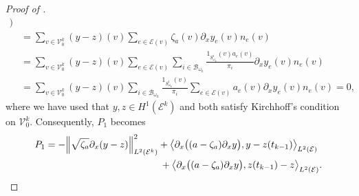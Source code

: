 \documentclass[a4paper, 10pt, english]{article}
\begin{document}
\begin{proof}[Proof of  ]
\begin{align*}
   \bigg)\\
   &= \sum_{v \in \mathcal{V}^k_0}
   (y - z)(v)
     \sum_{e \in \mathcal{E}(v)} \zeta_a(v)\partial_x y_e(v)n_e(v)
   \\
   &=\sum_{v \in \mathcal{V}^k_0}
   (y - z)(v)
     \sum_{e \in \mathcal{E}(v)} \sum_{i\in \mathcal{B}_{\omega_k}}\frac{1_{S_{\omega_k}^i}(v)a_e(v)}{\pi_i}\partial_x y_e(v)n_e(v)
     \\
   &=\sum_{v \in \mathcal{V}^k_0}
   (y - z)(v)
      \sum_{i\in \mathcal{B}_{\omega_k}}\frac{1_{S_{\omega_k}^i}(v)}{\pi_i}\sum_{e \in \mathcal{E}(v)}a_e(v)\partial_x y_e(v)n_e(v) = 0,
\end{align*}
where we have used that $y,z \in H^1(\mathcal{E}^k)$ and both satisfy Kirchhoff's condition on $\mathcal{V}_{0}^k$. 
Consequently, $P_1$ becomes
\begin{align}\label{eq:last_relation_p1}
P_1
&=
-\Bigl\|\sqrt{\zeta_a}\partial_x (y - z)\Bigr\|_{L^2(\mathcal{E}^k)}^2
+
\bigl\langle
  \partial_x\bigl((a - \zeta_a)\partial_x y\bigr),
  y - z(t_{k-1})
\bigr\rangle_{L^2(\mathcal{E})}
\nonumber \\
&\hspace{4.2cm}
+
\bigl\langle
  \partial_x\bigl((a - \zeta_a)\partial_x y\bigr),
  z(t_{k-1}) - z
\bigr\rangle_{L^2(\mathcal{E})}.
\end{align}


\end{proof}
\end{document}

